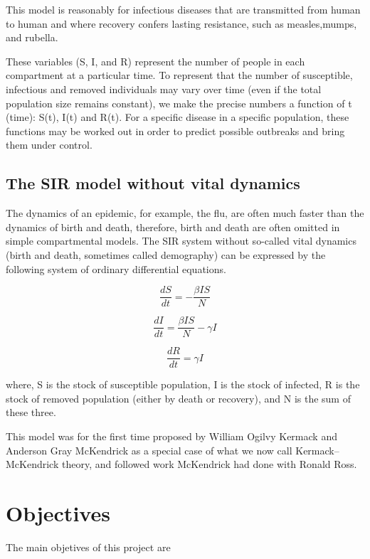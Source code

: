 \documentclass[a4paper, 12pt]{article}
\begin{document}
This model is reasonably for infectious diseases that are transmitted from human to human and where recovery confers lasting resistance, such as measles,mumps, and rubella.

These variables (S, I, and R) represent the number of people in each compartment at a particular time. To represent that the number of susceptible, infectious and removed individuals may vary over time (even if the total population size remains constant), we make the precise numbers a function of t (time): S(t), I(t) and R(t). For a specific disease in a specific population, these functions may be worked out in order to predict possible outbreaks and bring them under control.

\subsection{The SIR model without vital dynamics}
The dynamics of an epidemic, for example, the flu, are often much faster than the dynamics of birth and death, therefore, birth and death are often omitted in simple compartmental models. The SIR system without so-called vital dynamics (birth and death, sometimes called demography) can be expressed by the following system of ordinary differential equations.

\begin{equation}
\frac{dS}{dt} = -\frac{\beta IS}{N}
\end{equation}

\begin{equation}
\frac{dI}{dt} = \frac{\beta IS}{N} - \gamma I
\end{equation}

\begin{equation}
\frac{dR}{dt} = \gamma I
\end{equation}
 
 where, S is the stock of susceptible population, I is the stock of infected, R is the stock of removed population (either by death or recovery), and N is the sum of these three.
 
This model was for the first time proposed by William Ogilvy Kermack and Anderson Gray McKendrick as a special case of what we now call Kermack–McKendrick theory, and followed work McKendrick had done with Ronald Ross.

\clearpage

\section{Objectives}
The main objetives of this project are
\end{document}
